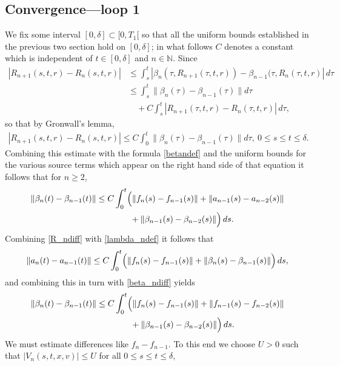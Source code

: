 \documentclass[11pt]{article}
\def\N{\mathbb N}
\begin{document}
\subsection{Convergence---loop 1}\label{loop1conv}
%
%
We fix some interval $[0,\delta]\subset [0,T_1[$ so that all the uniform
bounds established in the previous two section hold on $[0,\delta]$;
in what follows $C$ denotes a constant which is independent of $t\in [0,\delta]$
and $n\in \N$. Since
\begin{align*}
  |R_{n+1}(s,t,r) - R_n(s,t,r)|
  &\leq \int_s^t\!\!
  \left|\beta_n(\tau,R_{n+1}(\tau,t,r))
  -\beta_{n-1}(\tau,R_n(\tau,t,r)\right|\, d\tau\\
  &\leq
  \int_s^t \|\beta_n(\tau)-\beta_{n-1}(\tau)\| d\tau \\
  &\quad {}+ C \int_s^t
  \left|R_{n+1}(\tau,t,r)-R_n(\tau,t,r)\right|\, d\tau,
\end{align*}
so that by Gronwall's lemma,
\begin{align}\label{R_ndiff}
  |R_{n+1}(s,t,r) - R_n(s,t,r)|
  \leq C \int_0^t
  \|\beta_n(\tau)-\beta_{n-1}(\tau)\| d\tau,\ 0\leq s\leq t\leq \delta.
\end{align}
Combining this estimate with the formula \eqref{betandef} and the uniform bounds
for the various source terms which appear on the right hand side of that
equation it follows that for $n\geq 2$,
\begin{align}\label{beta_ndiff}
  \|\beta_n(t)-\beta_{n-1}(t)\|
  &\leq
  C \int_0^t\Bigl(\|f_n(s)-f_{n-1}(s)\| + \|a_{n-1}(s)-a_{n-2}(s)\| \notag\\
  &\qquad\qquad {}+ \|\beta_{n-1}(s)-\beta_{n-2}(s)\|\Bigr)\, ds .
\end{align}
Combining \eqref{R_ndiff} with \eqref{lambda_ndef} it follows that
\begin{align}\label{a_ndiff}
\|a_n(t)-a_{n-1}(t)\|
  \leq
  C \int_0^t\Bigl(\|f_n(s)-f_{n-1}(s)\| +
  \|\beta_{n}(s)-\beta_{n-1}(s)\|\Bigr)\, ds,
\end{align}
and combining this in turn with \eqref{beta_ndiff} yields
\begin{align}\label{beta_ndiff2}
  \|\beta_n(t)-\beta_{n-1}(t)\|
  &\leq
  C \int_0^t\Bigl(\|f_n(s)-f_{n-1}(s)\| + \|f_{n-1}(s)-f_{n-2}(s)\| \notag\\
  &\qquad\qquad {}+ \|\beta_{n-1}(s)-\beta_{n-2}(s)\|\Bigr)\, ds .
\end{align}
We must estimate differences like $f_n-f_{n-1}$. To this end we
choose $U>0$ such that $|V_n(s,t,x,v)| \leq U$ for all
$0\leq s\leq t\leq\delta$,
\end{document}

